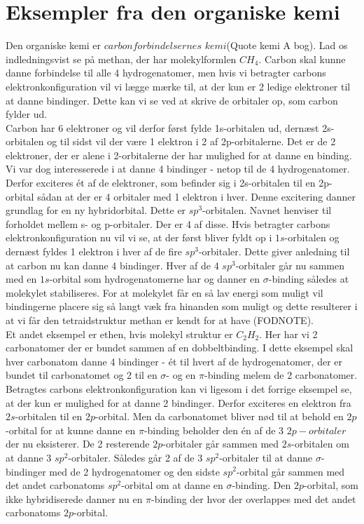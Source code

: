 \section{Eksempler fra den organiske kemi}
Den organiske kemi er $carbonforbindelsernes$ $kemi$(Quote kemi A bog). Lad os indledningsvist se på methan, der har molekylformlen $CH_4$. Carbon skal kunne danne forbindelse til alle 4 hydrogenatomer, men hvis vi betragter carbons elektronkonfiguration vil vi lægge mærke til, at der kun er 2 ledige elektroner til at danne bindinger. Dette kan vi se ved at skrive de orbitaler op, som carbon fylder ud.
\\

Carbon har 6 elektroner og vil derfor først fylde 1s-orbitalen ud, dernæst 2s-orbitalen og til sidst vil der være 1 elektron i 2 af 2p-orbitalerne. Det er de 2 elektroner, der er alene i 2-orbitalerne der har mulighed for at danne en binding. Vi var dog interesserede i at danne 4 bindinger - netop til de 4 hydrogenatomer. Derfor exciteres ét af de elektroner, som befinder sig i 2s-orbitalen til en 2p-orbital sådan at der er 4 orbitaler med 1 elektron i hver. Denne excitering danner grundlag for en ny hybridorbital. Dette er $sp^3$-orbitalen. Navnet henviser til forholdet mellem s- og p-orbitaler. Der er 4 af disse. Hvis betragter carbons elektronkonfiguration nu vil vi se, at der først bliver fyldt op i $1s$-orbitalen og dernæst fyldes 1 elektron i hver af de fire $sp^3$-orbitaler. Dette giver anledning til at carbon nu kan danne 4 bindinger. Hver af de 4 $sp^3$-orbitaler går nu sammen med en $1s$-orbital som hydrogenatomerne har og danner en $\sigma$-binding således at molekylet stabiliseres. For at molekylet får en så lav energi som muligt vil bindingerne placere sig så langt væk fra hinanden som muligt og dette resulterer i at vi får den tetraidstruktur methan er kendt for at have (FODNOTE). 
\\

Et andet eksempel er ethen, hvis molekyl struktur er $C_{2}H_2$. Her har vi 2 carbonatomer der er bundet sammen af en dobbeltbinding. I dette eksempel skal hver carbonatom danne 4 bindinger - ét til hvert af de hydrogenatomer, der er bundet til carbonatomet og 2 til en $\sigma$- og en $\pi$-binding melem de 2 carbonatomer. Betragtes carbons elektronkonfiguration kan vi ligesom i det forrige eksempel se, at der kun er mulighed for at danne 2 bindinger. Derfor exciteres en elektron fra $2s$-orbitalen til en $2p$-orbital. Men da carbonatomet bliver nød til at behold en $2p$-orbital for at kunne danne en $\pi$-binding beholder den én af de 3 $2p-orbitaler$ der nu eksisterer. De 2 resterende $2p$-orbitaler går sammen med $2s$-orbitalen om at danne 3 $sp^{2}$-orbitaler. Således går 2 af de 3 $sp^2$-orbitaler til at danne $\sigma$-bindinger med de 2 hydrogenatomer og den sidste $sp^2$-orbital går sammen med det andet carbonatoms $sp^2$-orbital om at danne en $\sigma$-binding. Den $2p$-orbital, som ikke hybridiserede danner nu en $\pi$-binding der hvor der overlappes med det andet carbonatoms $2p$-orbital. 


